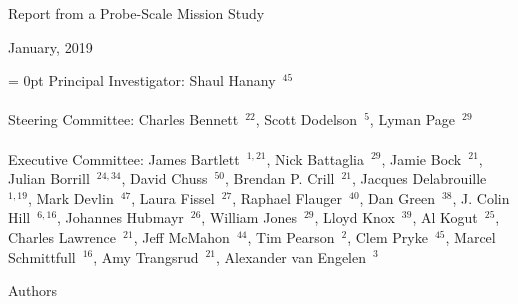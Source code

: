 \documentclass[PICOReport.tex]{subfiles}
\begin{document}
%
%
%
%
\Large{ \centerline{Report from a Probe-Scale Mission Study}}
\large{ \centerline{January, 2019 }}
\vspace{3pt} 

\parindent = 0pt
\small{
Principal Investigator: Shaul Hanany~$^{45}$ } \\
\vspace{-7pt} \\
\small{
Steering Committee: Charles Bennett~$^{22}$, Scott Dodelson~$^{5}$, Lyman Page~$^{29}$ } \\
\vspace{-7pt} \\
\small{
Executive Committee: 
James Bartlett~$^{1,21}$,
Nick Battaglia~$^{29}$,
Jamie Bock~$^{21}$, 
Julian Borrill~$^{24,34}$, 
David Chuss~$^{50}$,
Brendan P. Crill~$^{21}$, 
Jacques Delabrouille~$^{1,19}$,
Mark Devlin~$^{47}$, 
Laura Fissel~$^{27}$,
Raphael Flauger~$^{40}$, 
Dan Green~$^{38}$,
J. Colin Hill~$^{6,16}$,
Johannes Hubmayr~$^{26}$,
William Jones~$^{29}$, 
Lloyd Knox~$^{39}$, 
Al Kogut~$^{25}$, 
Charles Lawrence~$^{21}$, 
Jeff McMahon~$^{44}$, 
Tim Pearson~$^{2}$,
Clem Pryke~$^{45}$, 
Marcel Schmittfull~$^{16}$,
Amy Trangsrud~$^{21}$, 
Alexander van Engelen~$^3$ \\
}

\label{authorlist}

\Large  {\centerline {Authors}}
\end{document}
